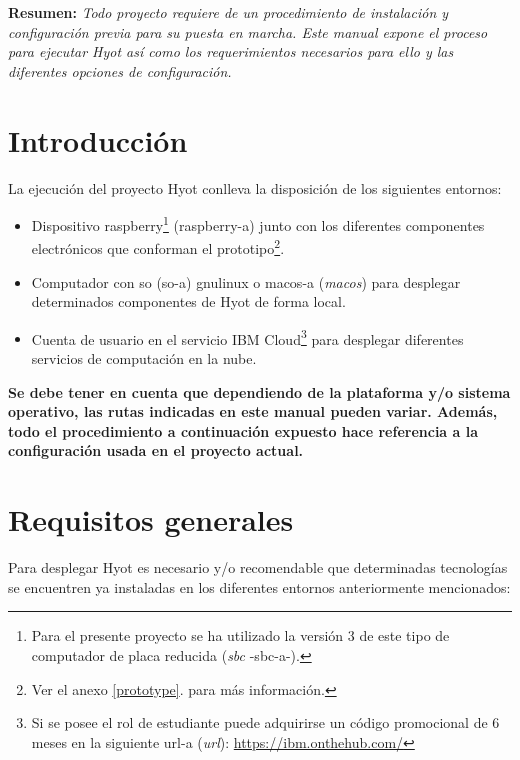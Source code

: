 \documentclass[12pt,a4paper, twoside]{report}
\begin{document}
	\textbf{Resumen:} \textit{Todo proyecto requiere de un procedimiento de instalación y configuración previa para su puesta en marcha. Este manual expone el proceso para ejecutar Hyot así como los requerimientos necesarios para ello y las diferentes opciones de configuración.}
	
	
	\section{Introducción}
	
	La ejecución del proyecto Hyot conlleva la disposición de los siguientes entornos:
	
	\begin{itemize}
		\item Dispositivo \gls{raspberry}\footnote{Para el presente proyecto se ha utilizado la versión 3 de este tipo de computador de placa reducida (\textit{\gls{sbc}} -\gls{sbc-a}-).} (\gls{raspberry-a}) junto con los diferentes componentes electrónicos que conforman el prototipo\footnote{Ver el anexo \ref{prototype}.  para más información.}.
		\item Computador con \gls{so} (\gls{so-a}) \gls{gnulinux} o \gls{macos-a} (\textit{\gls{macos}}) para desplegar determinados componentes de Hyot de forma local.
		\item Cuenta de usuario en el servicio IBM Cloud\footnote{Si se posee el rol de estudiante puede adquirirse un código promocional de 6 meses en la siguiente \gls{url-a} (\textit{\gls{url}}): \url{https://ibm.onthehub.com/}} \cite{ibmcloud:url} para desplegar diferentes servicios de computación en la nube.
	\end{itemize}
	
	\textbf{\color{red}Se debe tener en cuenta que dependiendo de la plataforma y/o sistema operativo, las rutas indicadas en este manual pueden variar. Además, todo el procedimiento a continuación expuesto hace referencia a la configuración usada en el proyecto actual.}
	
	\section{Requisitos generales}
	
	Para desplegar Hyot es necesario y/o recomendable que determinadas tecnologías se encuentren ya instaladas en los diferentes entornos anteriormente mencionados:
	
\end{document}
